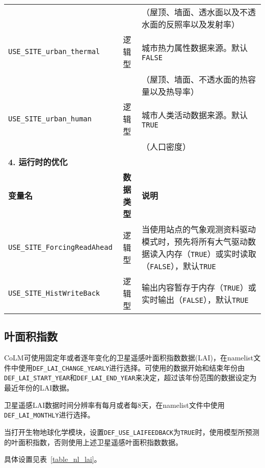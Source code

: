 \begin{longtable}{lcp{}}
& &（屋顶、墙面、透水面以及不透水面的反照率以及发射率） \\
\texttt{USE\_SITE\_urban\_thermal} & 逻辑型 & 城市热力属性数据来源。默认\texttt{FALSE} \\
& &（屋顶、墙面、不透水面的热容量以及热导率） \\
\texttt{USE\_SITE\_urban\_human} & 逻辑型 & 城市人类活动数据来源。默认\texttt{TRUE} \\
& &（人口密度）\\
\midrule
\textbf{4. 运行时的优化} & & \\
\textbf{变量名} & \textbf{数据类型} & \textbf{说明} \\
\texttt{USE\_SITE\_ForcingReadAhead} & 逻辑型 & 当使用站点的气象观测资料驱动模式时，预先将所有大气驱动数据读入内存（\texttt{TRUE}）或实时读取（\texttt{FALSE}），默认\texttt{TRUE} \\
\texttt{USE\_SITE\_HistWriteBack} & 逻辑型 & 输出内容暂存于内存（\texttt{TRUE}）或实时输出（\texttt{FALSE}），默认\texttt{TRUE} \\

\end{longtable}

\subsection{叶面积指数} \label{subsection_lai}

CoLM可使用固定年或者逐年变化的卫星遥感叶面积指数数据(LAI)，在namelist文件中使用\texttt{DEF\_LAI\_CHANGE\_YEARLY}进行选择。可使用的数据开始和结束年份由\texttt{DEF\allowbreak\_LAI\allowbreak\_START\allowbreak\_YEAR}和\texttt{DEF\_LAI\_END\_YEAR}来决定，超过该年份范围的数据设定为最近年份的LAI数据。

卫星遥感LAI数据时间分辨率有每月或者每8天，在namelist文件中使用\texttt{DEF\allowbreak\_LAI\allowbreak\_MONTHLY}进行选择。

当打开生物地球化学模块，设置\texttt{DEF\_USE\_LAIFEEDBACK}为\texttt{TRUE}时，使用模型所预测的叶面积指数，否则使用上述卫星遥感叶面积指数数据。

具体设置见表~\ref{table_nl_lai}。


